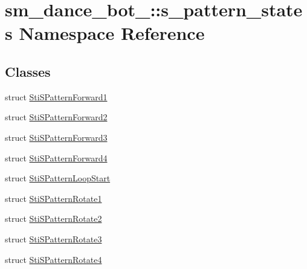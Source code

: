 \hypertarget{namespacesm__dance__bot__3_1_1s__pattern__states}{}\section{sm\+\_\+dance\+\_\+bot\+\_\+:\+:s\+\_\+pattern\+\_\+states Namespace Reference}
\label{namespacesm__dance__bot__3_1_1s__pattern__states}
\subsection*{Classes}
\begin{DoxyCompactItemize}
\item 
struct \hyperlink{structsm__dance__bot__3_1_1s__pattern__states_1_1StiSPatternForward1}{Sti\+S\+Pattern\+Forward1}
\item 
struct \hyperlink{structsm__dance__bot__3_1_1s__pattern__states_1_1StiSPatternForward2}{Sti\+S\+Pattern\+Forward2}
\item 
struct \hyperlink{structsm__dance__bot__3_1_1s__pattern__states_1_1StiSPatternForward3}{Sti\+S\+Pattern\+Forward3}
\item 
struct \hyperlink{structsm__dance__bot__3_1_1s__pattern__states_1_1StiSPatternForward4}{Sti\+S\+Pattern\+Forward4}
\item 
struct \hyperlink{structsm__dance__bot__3_1_1s__pattern__states_1_1StiSPatternLoopStart}{Sti\+S\+Pattern\+Loop\+Start}
\item 
struct \hyperlink{structsm__dance__bot__3_1_1s__pattern__states_1_1StiSPatternRotate1}{Sti\+S\+Pattern\+Rotate1}
\item 
struct \hyperlink{structsm__dance__bot__3_1_1s__pattern__states_1_1StiSPatternRotate2}{Sti\+S\+Pattern\+Rotate2}
\item 
struct \hyperlink{structsm__dance__bot__3_1_1s__pattern__states_1_1StiSPatternRotate3}{Sti\+S\+Pattern\+Rotate3}
\item 
struct \hyperlink{structsm__dance__bot__3_1_1s__pattern__states_1_1StiSPatternRotate4}{Sti\+S\+Pattern\+Rotate4}
\end{DoxyCompactItemize}
